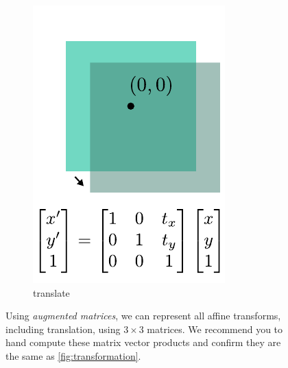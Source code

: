 \begin{figure}[t]
\begin{subfigure}[t]{0.195\linewidth}
        \includegraphics[width=\linewidth]{imgs/translate_affine.pdf}
        \caption{\label{fig:translate_affine} translate}
    \end{subfigure}
    \caption{\label{fig:transformation_affine} Using \emph{augmented matrices}, we can represent all affine transforms, including translation, using $3 \times 3$ matrices. We recommend you to hand compute these matrix vector products and confirm they are the same as \cref{fig:transformation}.}
\end{figure}

